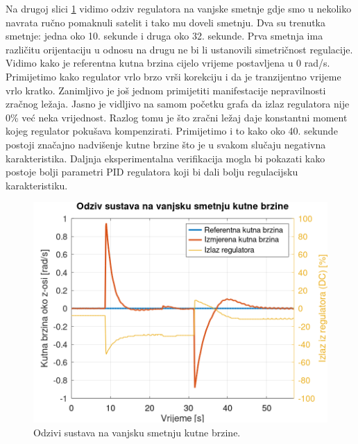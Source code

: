 \documentclass[times, utf8, diplomski, numeric]{templates/template}
\begin{document}
{{        Na drugoj slici \ref{fig:ang_vel_reg_dist} vidimo odziv regulatora na vanjske smetnje gdje smo u nekoliko navrata ručno pomaknuli satelit i tako mu doveli smetnju. Dva su trenutka smetnje: jedna oko 10. sekunde i druga oko 32. sekunde. Prva smetnja ima različitu orijentaciju u odnosu na drugu ne bi li ustanovili simetričnost regulacije. Vidimo kako je referentna kutna brzina cijelo vrijeme postavljena u 0 rad/s. Primijetimo kako regulator vrlo brzo vrši korekciju i da je tranzijentno vrijeme vrlo kratko. Zanimljivo je još jednom primijetiti manifestacije nepravilnosti zračnog ležaja. Jasno je vidljivo na samom početku grafa da izlaz regulatora nije 0\% već neka vrijednost. Razlog tomu je što zračni ležaj daje konstantni moment kojeg regulator pokušava kompenzirati. Primijetimo i to kako oko 40. sekunde postoji značajno nadvišenje kutne brzine što je u svakom slučaju negativna karakteristika. Daljnja eksperimentalna verifikacija mogla bi pokazati kako postoje bolji parametri PID regulatora koji bi dali bolju regulacijsku karakteristiku.

        \begin{figure}[htb]
        \centering
        \includegraphics[width=1.0\textwidth]{other/ang_vel_reg_dist.png}
        \caption{Odzivi sustava na vanjsku smetnju kutne brzine.}
        \label{fig:ang_vel_reg_dist}
        \end{figure}

}}
\end{document}
